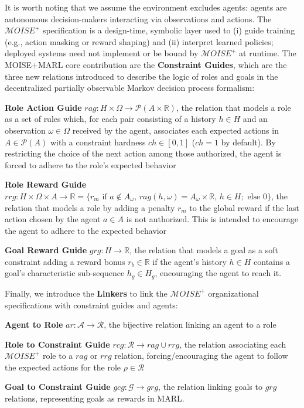 \documentclass[pdflatex,sn-mathphys-num]{sn-jnl}%
\theoremstyle{thmstyleone}%
\theoremstyle{thmstyletwo}%
\theoremstyle{thmstylethree}%
\begin{document}
It is worth noting that we assume the environment excludes agents: agents are autonomous decision-makers interacting via observations and actions. The $\mathcal{M}OISE^+$ specification is a design-time, symbolic layer used to (i) guide training (e.g., action masking or reward shaping) and (ii) interpret learned policies; deployed systems need not implement or be bound by $\mathcal{M}OISE^+$ at runtime.
The MOISE+MARL core contribution are the \textbf{Constraint Guides}, which are the three new relations introduced to describe the logic of roles and goals in the decentralized partially observable Markov decision process formalism:
%
\begin{enumerate*}[label={\roman*) },itemjoin={; \quad}]
    
    \item \textbf{Role Action Guide} \quad $rag: H \times \Omega \rightarrow \mathcal{P}(A \times \mathbb{R})$, the relation that models a role as a set of rules which, for each pair consisting of a history $h \in H$ and an observation $\omega \in \Omega$ received by the agent, associates each expected actions in $A \in \mathcal{P}(A)$ with a constraint hardness $ch \in [0,1]$ ($ch = 1$ by default). By restricting the choice of the next action among those authorized, the agent is forced to adhere to the role's expected behavior
    \item \textbf{Role Reward Guide} \quad $rrg: H \times \Omega \times A \to \mathbb{R} = \{r_m \text{ if } a \notin A_\omega \text{, } rag(h, \omega) \allowbreak = \allowbreak A_\omega \times \mathbb{R} \text{, } h \in H; \text{ else } 0\}$, the relation that models a role by adding a penalty $r_m$ to the global reward if the last action chosen by the agent $a \in A$ is not authorized. This is intended to encourage the agent to adhere to the expected behavior
    \item \textbf{Goal Reward Guide} \quad $grg: H \rightarrow \mathbb{R}$, the relation that models a goal as a soft constraint adding a reward bonus $r_b \in \mathbb{R}$ if the agent's history $h \in H$ contains a goal's characteristic sub-sequence $h_g \in H_g$, encouraging the agent to reach it.
\end{enumerate*}

\noindent Finally, we introduce the \textbf{Linkers} to link the $\mathcal{M}OISE^+$ organizational specifications with constraint guides and agents:
%
\begin{enumerate*}[label={\roman*) },itemjoin={; \quad}]
    
    \item \textbf{Agent to Role} \quad $ar: \mathcal{A} \to \mathcal{R}$, the bijective relation linking an agent to a role
    \item \textbf{Role to Constraint Guide} \quad $rcg: \mathcal{R} \rightarrow rag \cup rrg$, the relation associating each $\mathcal{M}OISE^+$ role to a $rag$ or $rrg$ relation, forcing/encouraging the agent to follow the expected actions for the role $\rho \in \mathcal{R}$
    \item \textbf{Goal to Constraint Guide} \quad $gcg: \mathcal{G} \rightarrow grg$, the relation linking goals to $grg$ relations, representing goals as rewards in MARL.
\end{enumerate*}
\end{document}
